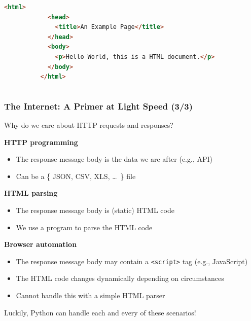 \documentclass[10pt, aspectratio=1610, natbib, handout]{beamer}
\begin{document}
\begin{frame}[fragile]
\begin{columns}
\begin{column}{0.60\textwidth}
\begin{lstlisting}[language=HTML]
          <html>
            <head>
              <title>An Example Page</title>
            </head>
            <body>
              <p>Hello World, this is a HTML document.</p>
            </body>
          </html>
        \end{lstlisting}
      \end{column}
    \end{columns}

  \end{frame}

  \begin{frame}
    \frametitle{The Internet: A Primer at Light Speed (3/3)}

    Why do we care about HTTP requests and responses?

    \vfill\pause

    \textbf{HTTP programming}
    \begin{itemize}
      \item The response message body is the data we are after (e.g., API)
      \item Can be a \{ JSON, CSV, XLS, \dots\ \} file
    \end{itemize}

    \vfill\pause

    \textbf{HTML parsing}
    \begin{itemize}
      \item The response message body is (static) HTML code
      \item We use a program to parse the HTML code
    \end{itemize}

    \vfill\pause

    \textbf{Browser automation}
    \begin{itemize}
      \item The response message body may contain a \texttt{<script>} tag (e.g., JavaScript)
      \item The HTML code changes dynamically depending on circumstances
      \item Cannot handle this with a simple HTML parser
    \end{itemize}

    \vfill\pause

    Luckily, Python can handle each and every of these scenarios!

  \end{frame}
\end{document}
